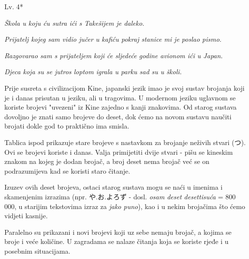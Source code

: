 	\begin{mondai}{Lv. 4*}
		\item \textit{Škola u koju ću sutra ići s Takešijem je daleko.}
		\item \textit{Prijatelj kojeg sam vidio jučer u kafiću pokraj stanice mi je poslao pismo.}
		\item \textit{Razgovarao sam s prijateljem koji će sljedeće godine avionom ići u Japan.}
		\item \textit{Djeca koja su se jutros loptom igrala u parku sad su u školi.}
	\end{mondai}
\newpage
{}

	
	Prije susreta s civilizacijom Kine, japanski jezik imao je svoj sustav brojanja koji je i danas prisutan u jeziku, ali u tragovima. U modernom jeziku uglavnom se koriste brojevi "uvezeni" iz Kine zajedno s kanji znakovima. Od starog sustava dovoljno je znati samo brojeve do deset, dok ćemo na novom sustavu naučiti brojati dokle god to praktično ima smisla.
	
	
	Tablica ispod prikazuje stare brojeve s nastavkom za brojanje neživih stvari (つ). Ovi se brojevi koriste i danas. Valja primijetiti dvije stvari - pišu se kineskim znakom na kojeg je dodan brojač, a broj deset nema brojač već se on podrazumijeva kad se koristi staro čitanje.

	Izuzev ovih deset brojeva, ostaci starog sustava mogu se naći u imenima i skamenjenim izrazima (npr. や.お.よろず - dosl. \textit{osam deset desettisuća} = 800 000, u starijim tekstovima izraz za \textit{jako puno}), kao i u nekim brojačima što ćemo vidjeti kasnije.
	
	Paralelno su prikazani i novi brojevi koji uz sebe nemaju brojač, a kojima se broje i veće količine. U zagradama se nalaze čitanja koja se koriste rjeđe i u posebnim situacijama.
	
